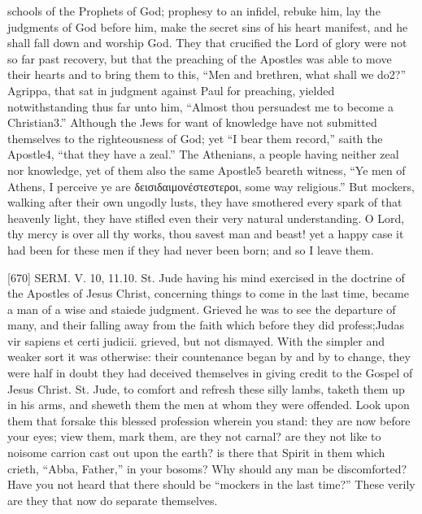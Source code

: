 schools of the Prophets of God; prophesy to an infidel, rebuke him, lay the judgments of God before him, make the secret sins of his heart manifest, and he shall fall down and worship God. They that crucified the Lord of glory were not so far past recovery, but that the preaching of the Apostles was able to move their hearts and to bring them to this, “Men and brethren, what shall we do2?” Agrippa, that sat in judgment against Paul for preaching, yielded notwithstanding thus far unto him, “Almost thou persuadest me to become a Christian3.” Although the Jews for want of knowledge have not submitted themselves to the righteousness of God; yet “I bear them record,” saith the Apostle4, “that they have a zeal.” The Athenians, a people having neither zeal nor knowledge, yet of them also the same Apostle5 beareth witness, “Ye men of Athens, I perceive ye are δεισιδαιμονέστεστεροι, some way religious.” But mockers, walking after their own ungodly lusts, they have smothered every spark of that heavenly light, they have stifled even their very natural understanding. O Lord, thy mercy is over all thy works, thou savest man and beast! yet a happy case it had been for these men if they had never been born; and so I leave them.

[670]
SERM. V. 10, 11.10. St. Jude having his mind exercised in the doctrine of the Apostles of Jesus Christ, concerning things to come in the last time, became a man of a wise and staiede judgment. Grieved he was to see the departure of many, and their falling away from the faith which before they did profess;Judas vir sapiens et certi judicii. grieved, but not dismayed. With the simpler and weaker sort it was otherwise: their countenance began by and by to change, they were half in doubt they had deceived themselves in giving credit to the Gospel of Jesus Christ. St. Jude, to comfort and refresh these silly lambs, taketh them up in his arms, and sheweth them the men at whom they were offended. Look upon them that forsake this blessed profession wherein you stand: they are now before your eyes; view them, mark them, are they not carnal? are they not like to noisome carrion cast out upon the earth? is there that Spirit in them which crieth, “Abba, Father,” in your bosoms? Why should any man be discomforted? Have you not heard that there should be “mockers in the last time?” These verily are they that now do separate themselves.

